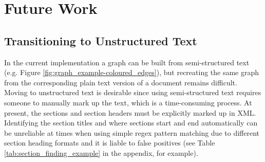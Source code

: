 \documentclass[12pt]{article}
\theoremstyle{grammarstyle}
\begin{document}
\section{Future Work} \label{sec:future_work}
\subsection{Transitioning to Unstructured Text}
In the current implementation a graph can be built from semi-structured text (e.g. Figure \ref{fig:graph_example-coloured_edges}), but recreating the same graph from the corresponding plain text version of a document remains difficult. Moving to unstructured text is desirable since using semi-structured text requires someone to manually mark up the text, which is a time-consuming process. At present, the sections and section headers must be explicitly marked up in XML.  Identifying the section titles and where sections start and end automatically can be unreliable at times when using simple regex pattern matching due to different section heading formats and it is liable to false positives (see Table \ref{tab:section_finding_example} in the appendix, for example). 

\end{document}
